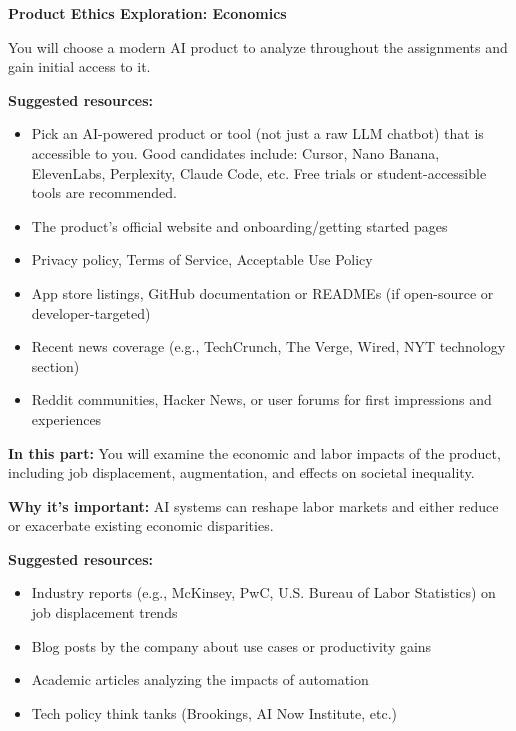 \item {\bf Product Ethics Exploration: Economics}

You will choose a modern AI product to analyze throughout the assignments and gain initial access to it.

\textbf{Suggested resources:}
\begin{itemize}
    \item Pick an AI-powered product or tool (not just a raw LLM chatbot) that is accessible to you. Good candidates include: Cursor, Nano Banana, ElevenLabs, Perplexity, Claude Code, etc. Free trials or student-accessible tools are recommended.
    \item The product's official website and onboarding/getting started pages
    \item Privacy policy, Terms of Service, Acceptable Use Policy
    \item App store listings, GitHub documentation or READMEs (if open-source or developer-targeted)
    \item Recent news coverage (e.g., TechCrunch, The Verge, Wired, NYT technology section)
    \item Reddit communities, Hacker News, or user forums for first impressions and experiences
\end{itemize}

\textbf{In this part:} You will examine the economic and labor impacts of the product, including job displacement, augmentation, and effects on societal inequality.

\vspace{2mm}

\textbf{Why it's important:} AI systems can reshape labor markets and either reduce or exacerbate existing economic disparities.

\vspace{2mm}

\textbf{Suggested resources:}
\begin{itemize}
  \item Industry reports (e.g., McKinsey, PwC, U.S. Bureau of Labor Statistics) on job displacement trends
  \item Blog posts by the company about use cases or productivity gains
  \item Academic articles analyzing the impacts of automation
  \item Tech policy think tanks (Brookings, AI Now Institute, etc.)
\end{itemize}

\begin{enumerate}

  
  
  
  

\end{enumerate}
